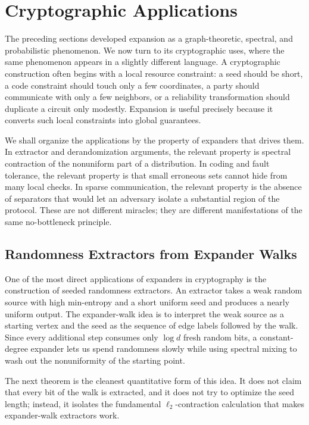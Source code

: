 \section{Cryptographic Applications}
\label{sec:cryptographic-applications}

The preceding sections developed expansion as a graph-theoretic, spectral, and probabilistic phenomenon. We now turn to its cryptographic uses, where the same phenomenon appears in a slightly different language. A cryptographic construction often begins with a local resource constraint: a seed should be short, a code constraint should touch only a few coordinates, a party should communicate with only a few neighbors, or a reliability transformation should duplicate a circuit only modestly. Expansion is useful precisely because it converts such local constraints into global guarantees.

We shall organize the applications by the property of expanders that drives them. In extractor and derandomization arguments, the relevant property is spectral contraction of the nonuniform part of a distribution. In coding and fault tolerance, the relevant property is that small erroneous sets cannot hide from many local checks. In sparse communication, the relevant property is the absence of separators that would let an adversary isolate a substantial region of the protocol. These are not different miracles; they are different manifestations of the same no-bottleneck principle.

\subsection{Randomness Extractors from Expander Walks}
\label{subsec:extractors}

One of the most direct applications of expanders in cryptography is the construction of seeded randomness extractors. An extractor takes a weak random source with high min-entropy and a short uniform seed and produces a nearly uniform output. The expander-walk idea is to interpret the weak source as a starting vertex and the seed as the sequence of edge labels followed by the walk. Since every additional step consumes only \(\log d\) fresh random bits, a constant-degree expander lets us spend randomness slowly while using spectral mixing to wash out the nonuniformity of the starting point.

The next theorem is the cleanest quantitative form of this idea. It does not claim that every bit of the walk is extracted, and it does not try to optimize the seed length; instead, it isolates the fundamental \(\ell_2\)-contraction calculation that makes expander-walk extractors work.

